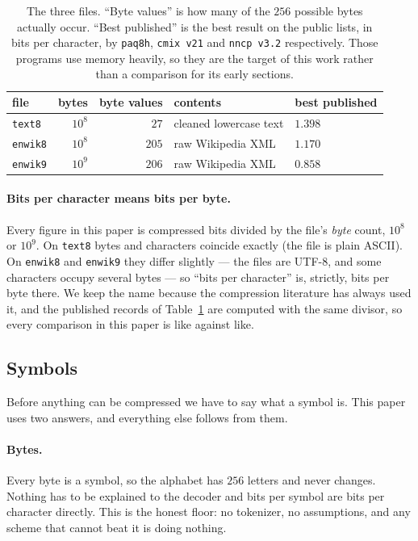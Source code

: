 \documentclass[11pt]{article}
\begin{document}
\begin{table}[ht]
\centering
\begin{tabular}{lrrll}
\toprule
file & bytes & byte values & contents & best published \\
\midrule
\texttt{text8}  & $10^8$ & $27$  & cleaned lowercase text & $1.398$ \\
\texttt{enwik8} & $10^8$ & $205$ & raw Wikipedia XML      & $1.170$ \\
\texttt{enwik9} & $10^9$ & $206$ & raw Wikipedia XML      & $0.858$ \\
\bottomrule
\end{tabular}
\caption{The three files.  ``Byte values'' is how many of the $256$
  possible bytes actually occur.  ``Best published'' is the best result
  on the public lists, in bits per character, by \texttt{paq8h},
  \texttt{cmix~v21} and \texttt{nncp~v3.2} respectively.  Those programs
  use memory heavily, so they are the target of this work rather than
  a comparison for its early sections.}
\label{tab:files}
\end{table}

\paragraph{Bits per character means bits per byte.}  Every figure in
this paper is compressed bits divided by the file's \emph{byte}
count, $10^{8}$ or $10^{9}$.  On \texttt{text8} bytes and characters
coincide exactly (the file is plain ASCII).  On \texttt{enwik8} and
\texttt{enwik9} they differ slightly --- the files are UTF-8, and
some characters occupy several bytes --- so ``bits per character''
is, strictly, bits per byte there.  We keep the name because the
compression literature has always used it, and the published records
of Table~\ref{tab:files} are computed with the same divisor, so
every comparison in this paper is like against like.

\subsection*{Symbols}

Before anything can be compressed we have to say what a symbol is.  This
paper uses two answers, and everything else follows from them.

\paragraph{Bytes.}  Every byte is a symbol, so the alphabet has $256$
letters and never changes.  Nothing has to be explained to the decoder
and bits per symbol are bits per character directly.  This is the honest
floor: no tokenizer, no assumptions, and any scheme that cannot beat it
is doing nothing.
\end{document}
